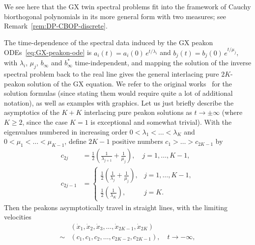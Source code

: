 \documentclass[10pt,a4paper]{article} \pdfoutput=1 
\begin{document}
\begin{remark}
  We see here that the GX twin spectral problems fit into the framework of
  Cauchy biorthogonal polynomials in its more general form
  with two measures; see Remark~\ref{rem:DP-CBOP-discrete}.
\end{remark}

The time-dependence of the spectral data induced by the GX peakon ODEs~\eqref{eq:GX-peakon-ode}
is $a_i(t) = a_i(0) \, e^{t/\lambda_i}$
and $b_j(t) = b_j(0) \, e^{t/\mu_j}$,
with $\lambda_i$, $\mu_j$, $b_\infty$ and $b_\infty^*$ time-independent,
and mapping the solution of the inverse spectral problem back to the real line
gives the general interlacing pure $2K$-peakon solution of the GX equation.
We refer to the original works~\cite{lundmark-szmigielski:2016:GX-inverse-problem,lundmark-szmigielski:2017:GX-dynamics-interlacing}
for the solution formulas (since stating them would require quite a lot of additional notation),
as well as examples with graphics.
Let us just briefly describe the asymptotics of the $K+K$ interlacing pure peakon solutions
as $t \to \pm \infty$ (where $K \ge 2$, since the case $K=1$ is exceptional and somewhat trivial).
With the eigenvalues numbered in increasing order $0 < \lambda_1 < \ldots < \lambda_K$
and $0 < \mu_1 < \dots < \mu_{K-1}$, define $2K-1$ positive numbers
$c_1 > \dots > c_{2K-1}$ by
\begin{equation}
  \label{eq:GX-asymptotic-velocities}
  \begin{aligned}
    c_{2j}
    &=
    \frac12 \left( \frac{1}{\lambda_{j+1}} + \frac{1}{\mu_{j}} \right)
    ,\quad
    j = 1, \dots, K-1
    ,\\[1.5ex]
    c_{2j-1}
    &=
    \begin{cases}
      \displaystyle
      \frac12 \left( \frac{1}{\lambda_{j}} + \frac{1}{\mu_{j}} \right)
      ,&
      j = 1, \dots, K-1
      ,\\[2ex] \displaystyle
      \frac12 \left( \frac{1}{\lambda_{K}} \right)
      ,&
      j = K
      .
    \end{cases}
  \end{aligned}
\end{equation}
Then the peakons asymptotically travel in straight lines, with the limiting velocities
\begin{equation}
  \begin{split}
    &
    (\dot x_1, \dot x_2, \dot x_3, \dots, \dot x_{2K-1}, \dot x_{2K})
    \\
    \sim
    &
    (c_1, c_1, c_2, \dots, c_{2K-2}, c_{2K-1})
    , \quad
    t \to -\infty
    ,
  \end{split}
\end{equation}
\end{document}

